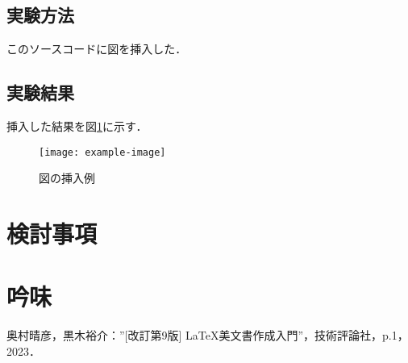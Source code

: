 \documentclass[11pt]{ltjsarticle}
\begin{document}
\subsection{実験方法}
このソースコードに図を挿入した．

\subsection{実験結果}
挿入した結果を図\ref{fig:example-image}に示す．
\begin{figure}[H]
  \centering
  \texttt{[image: example-image]}
  \caption{図の挿入例}
  \label{fig:example-image}
\end{figure}

\pagebreak

\section{検討事項}

\pagebreak

\section{吟味}

\pagebreak

\begin{thebibliography}{9}
  奥村晴彦，黒木裕介：”[改訂第9版] \LaTeX 美文書作成入門”，技術評論社，p.1，2023．
\end{thebibliography}
\end{document}
